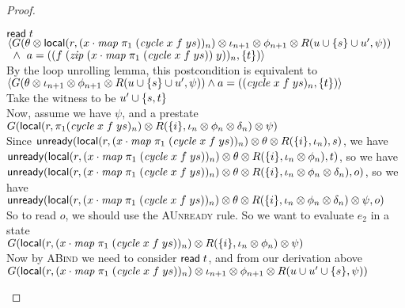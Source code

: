 \begin{proof}
\begin{tabbedproof}
\ooo $\mathsf{read}\; t$ \\
\ooo $\left<G(\theta \otimes \mathsf{local}({r}, {(x \cdot \mathit{map}\;\pi_1\;(\mathit{cycle}\;x\;f\;ys))_n}) \otimes \iota_{n+1} \otimes \phi_{n+1} \otimes R(u \cup \{{s}\} \cup u', \psi))\right.$\\
\ooo $\;\;\land\;\left.a = ((f\;(\mathit{zip}\;(x \cdot \mathit{map}\;\pi_1\;(\mathit{cycle}\;x\;f\;ys))\;y))_n, \{{t}\})\right>$\\
\ooo By the loop unrolling lemma, this postcondition is equivalent to  \\
\ooo $\left<G(\theta \otimes \iota_{n+1} \otimes \phi_{n+1} \otimes R(u \cup \{{s}\} \cup u', \psi))
            \land a = ((\mathit{cycle}\;x\;f\;ys)_n, \{{t}\})\right>$\\
\oo Take the witness to be $u' \cup \{{s, t}\}$ \\
\oo Now, assume we have $\psi$, and a prestate \\
\oo $G(\mathsf{local}({r}, {\pi_1(\mathit{cycle}\;x\;f\;ys)_n}) \otimes R(\{{i}\}, \iota_n \otimes \phi_n \otimes \delta_n) \otimes \psi)$ \\
\oo Since $\mathsf{unready}({\mathsf{local}({r}, {(x \cdot \mathit{map}\;\pi_1\;(\mathit{cycle}\;x\;f\;ys))_n}) \otimes \theta \otimes R(\{{i}\}, \iota_n)}, {s})$, we have \\
\oox $\mathsf{unready}({\mathsf{local}({r}, {(x \cdot \mathit{map}\;\pi_1\;(\mathit{cycle}\;x\;f\;ys))_n}) \otimes \theta \otimes R(\{{i}\}, \iota_n \otimes \phi_n)}, {t})$, so we have \\
\oox $\mathsf{unready}({\mathsf{local}({r}, {(x \cdot \mathit{map}\;\pi_1\;(\mathit{cycle}\;x\;f\;ys))_n}) \otimes \theta \otimes R(\{{i}\}, \iota_n \otimes \phi_n \otimes \delta_n)}, {o})$, so we have \\
\oox $\mathsf{unready}({\mathsf{local}({r}, {(x \cdot \mathit{map}\;\pi_1\;(\mathit{cycle}\;x\;f\;ys))_n}) \otimes \theta \otimes R(\{{i}\}, \iota_n \otimes \phi_n \otimes \delta_n) \otimes \psi}, {o})$ \\
\oo So to read $o$, we should use the \textsc{AUnready} rule. So we want to evaluate $e_2$ in a state\\
\oo $G(\mathsf{local}({r}, {(x \cdot \mathit{map}\;\pi_1\;(\mathit{cycle}\;x\;f\;ys))_n}) \otimes R(\{{i}\}, \iota_n \otimes \phi_n) \otimes \psi)$\\
\oo Now by \textsc{ABind} we need to consider $\mathsf{read}\; t$, and from our derivation above \\
\oo $G(\mathsf{local}({r}, {(x \cdot \mathit{map}\;\pi_1\;(\mathit{cycle}\;x\;f\;ys))_n}) \otimes \iota_{n+1} \otimes \phi_{n+1} \otimes R(u \cup u' \cup \{{s}\}, \psi))$\\

\end{tabbedproof}
\end{proof}
